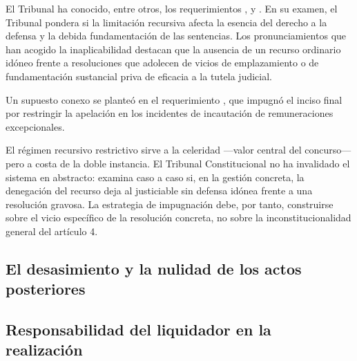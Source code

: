 El Tribunal ha conocido, entre otros, los requerimientos 
\parencite{juris-tc-11421-2021},  y 
\parencite{juris-tc-12539-2021, juris-tc-12527-2021}. En su examen, el Tribunal pondera si la
limitación recursiva afecta la esencia del derecho a la defensa y la debida fundamentación de
las sentencias. Los pronunciamientos que han acogido la inaplicabilidad destacan que la
ausencia de un recurso ordinario idóneo frente a resoluciones que adolecen de vicios de
emplazamiento o de fundamentación sustancial priva de eficacia a la tutela judicial.

Un supuesto conexo se planteó en el requerimiento 
\parencite{juris-tc-10957-2021}, que impugnó el  inciso final por restringir la
apelación en los incidentes de incautación de remuneraciones excepcionales.

\begin{foco}
El régimen recursivo restrictivo sirve a la celeridad ---valor central del concurso--- pero a
costa de la doble instancia. El Tribunal Constitucional no ha invalidado el sistema en
abstracto: examina caso a caso si, en la gestión concreta, la denegación del recurso deja al
justiciable sin defensa idónea frente a una resolución gravosa. La estrategia de impugnación
debe, por tanto, construirse sobre el vicio específico de la resolución concreta, no sobre la
inconstitucionalidad general del artículo 4.
\end{foco}

\subsection{El desasimiento y la nulidad de los actos posteriores}


\subsection{Responsabilidad del liquidador en la realización}

